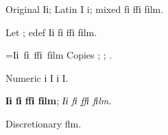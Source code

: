 \documentclass[10pt]{article}
\begin{document}
\noindent Original Іі; Latin I i; mixed fі ffі fіlm.\par
\begingroup\let\SavedI\CYRII\let\Savedi\cyrii
\noindent Let \SavedI\Savedi; edef \edef\SavedText{Іі fі ffі fіlm}\SavedText.\par
\endgroup
{}=\hbox{Іі fі ffі fіlm}
\noindent Copies ; ; .\par
\noindent Numeric  і І  і  І.\par
\noindent \textbf{Іі fі ffі fіlm}; \textit{Іі fі ffі fіlm}.\par
\noindent Discretionary flm.\par
\end{document}
